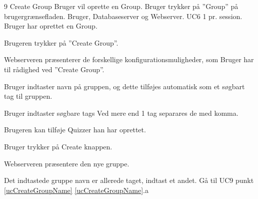 
\uchead
	{9}
	{Create Group}
	{Bruger vil oprette en Group.}
	{Bruger trykker på ''Group'' på brugergrænsefladen.}
	{Bruger, Databaseserver og Webserver.}
	{UC6}
	{1 pr. session.}
	{Bruger har oprettet en Group.}
\item Brugeren trykker på ''Create Group''.

\item Webserveren præsenterer de forskellige konfigurationsmuligheder, som Bruger har til rådighed ved ''Create Group''.

\item \label{ucCreateGroupName} Bruger indtaster navn på gruppen, og dette tilføjes automatisk som et søgbart tag til gruppen.

\item Bruger indtaster søgbare tags Ved mere end 1 tag separares de med komma.
\item Brugeren kan tilføje Quizzer han har oprettet.

\item Bruger trykker på Create knappen.

\item Webserveren præsentere den nye gruppe.

\ucdescriptionend

\ucextension
	{Det indtastede gruppe navn er allerede taget, indtast et andet.}
	{Gå til UC9 punkt \ref{ucCreateGroupName}}
	{\ref{ucCreateGroupName}.a}
		
